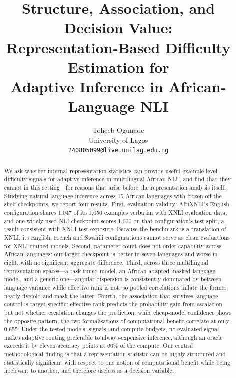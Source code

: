 \documentclass[11pt]{article}
\title{Structure, Association, and Decision Value:\\
Representation-Based Difficulty Estimation for\\
Adaptive Inference in African-Language NLI}
\author{
  Toheeb Ogunade\\
  University of Lagos\\
  \texttt{240805099@live.unilag.edu.ng}
}
\date{}
\newcommand{\claim}[1]{#1}   %
\begin{document}
\maketitle

\begin{abstract}
\claim{We ask whether internal representation statistics can provide useful
example-level difficulty signals for adaptive inference in multilingual African
NLP, and find that they cannot in this setting---for reasons that arise before
the representation analysis itself.} Studying natural language inference across
15 African languages with frozen off-the-shelf checkpoints, we report four
results. First, evaluation validity:
\claim{AfriXNLI's English configuration shares 1{,}047 of its 1{,}050 examples
verbatim with XNLI evaluation data, and one widely used NLI checkpoint scores
1.000 on that configuration's test split, a result consistent with XNLI test
exposure.} Because the benchmark is a translation of XNLI, its English, French
and Swahili configurations cannot serve as clean evaluations for XNLI-trained
models. Second, parameter count does not order capability across African
languages: our larger checkpoint is better in seven languages and worse in
eight, with no significant aggregate difference. Third, across three multilingual
representation spaces---a task-tuned model, an African-adapted masked language
model, and a generic one---angular dispersion is consistently dominated by
between-language variance while effective rank is not, so pooled correlations
inflate the former nearly fivefold and mask the latter. Fourth, the association
that survives language control is target-specific: effective rank predicts the
probability gain from escalation but not whether escalation changes the
prediction, while cheap-model confidence shows the opposite pattern; the two
formalisations of computational benefit correlate at only $0.655$. Under the
tested models, signals, and compute budgets, no evaluated signal makes adaptive
routing preferable to always-expensive inference, although an oracle exceeds it
by eleven accuracy points at 60\% of the compute.
\claim{Our central methodological finding is that a representation statistic can
be highly structured and statistically significant with respect to one notion of
computational benefit while being irrelevant to another, and therefore useless as
a decision variable.}
\end{abstract}

\end{document}
